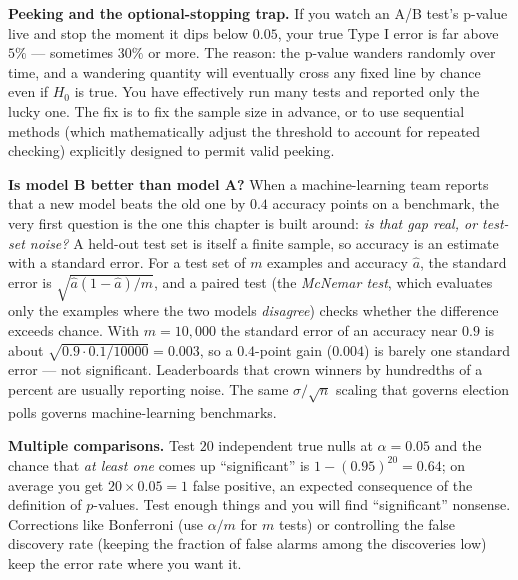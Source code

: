 \begin{trapbox}
\textbf{Peeking and the optional-stopping trap.} If you watch an A/B test's p-value live
and stop the moment it dips below $0.05$, your true Type I error is far above $5\%$ ---
sometimes $30\%$ or more. The reason: the p-value wanders randomly over time, and a
wandering quantity will eventually cross any fixed line by chance even if $H_0$ is true.
You have effectively run many tests and reported only the lucky one. The fix is to fix
the sample size in advance, or to use sequential methods (which mathematically adjust the threshold to account for repeated checking) explicitly designed to permit valid peeking.
\end{trapbox}

\begin{applicationbox}
\textbf{Is model B better than model A?} When a machine-learning team reports
that a new model beats the old one by $0.4$ accuracy points on a benchmark, the very
first question is the one this chapter is built around: \emph{is that gap real, or test-set
noise?} A held-out test set is itself a finite sample, so accuracy is an estimate with a
standard error. For a test set of $m$ examples and accuracy $\hat a$, the standard error
is $\sqrt{\hat a(1-\hat a)/m}$, and a paired test (the \emph{McNemar test}, which evaluates
only the examples where the two models \emph{disagree}) checks whether the difference
exceeds chance. With $m=10{,}000$ the standard error of an accuracy near $0.9$ is about
$\sqrt{0.9\cdot 0.1/10000}=0.003$, so a $0.4$-point gain ($0.004$) is barely one standard
error --- not significant. Leaderboards that crown winners by hundredths of a percent are
usually reporting noise. The same $\sigma/\sqrt n$ scaling that governs election polls
governs machine-learning benchmarks.
\end{applicationbox}

\begin{trapbox}
\textbf{Multiple comparisons.} Test $20$ independent true nulls at $\alpha=0.05$ and the
chance that \emph{at least one} comes up ``significant'' is $1-(0.95)^{20}=0.64$; on
average you get $20 \times 0.05 = 1$ false positive, an expected consequence of the
definition of $p$-values. Test enough things and you will find ``significant'' nonsense. Corrections
like Bonferroni (use $\alpha/m$ for $m$ tests) or controlling the false discovery rate (keeping the fraction of false alarms among the discoveries low)
keep the error rate where you want it.
\end{trapbox}

